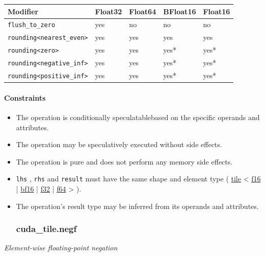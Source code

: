 \documentclass{article}
\begin{document}
\begin{longtable}{l|l|l|l|l}
\hline
Modifier & Float32 & Float64 & BFloat16 & Float16 \\ \hline
\texttt{flush\_to\_zero} & yes & no & no & no \\ \hline
\texttt{rounding<nearest\_even>} & yes & yes & yes & yes \\ \hline
\texttt{rounding<zero>} & yes & yes & yes* & yes* \\ \hline
\texttt{rounding<negative\_inf>} & yes & yes & yes* & yes* \\ \hline
\texttt{rounding<positive\_inf>} & yes & yes & yes* & yes* \\ \hline
\end{longtable}


\paragraph{Constraints}

\begin{itemize}
\item The operation is conditionally speculatablebased on the specific operands and attributes.
\item The operation may be speculatively executed without side effects.
\item The operation is pure and does not perform any memory side effects.
\item \texttt{lhs} , \texttt{rhs} and \texttt{result} must have the same shape and element type ( \href{https://docs.nvidia.com/cuda/tile-ir/latest/sections/types.html#type-tile}{tile} < \href{https://docs.nvidia.com/cuda/tile-ir/latest/sections/types.html#subsection-element-types}{f16} | \href{https://docs.nvidia.com/cuda/tile-ir/latest/sections/types.html#subsection-element-types}{bf16} | \href{https://docs.nvidia.com/cuda/tile-ir/latest/sections/types.html#subsection-element-types}{f32} | \href{https://docs.nvidia.com/cuda/tile-ir/latest/sections/types.html#subsection-element-types}{f64} > ).
\item The operation's result type may be inferred from its operands and attributes.


\subsubsection{cuda\_tile.negf}

\end{itemize}
\textit{Element-wise floating-point negation}
\end{document}
